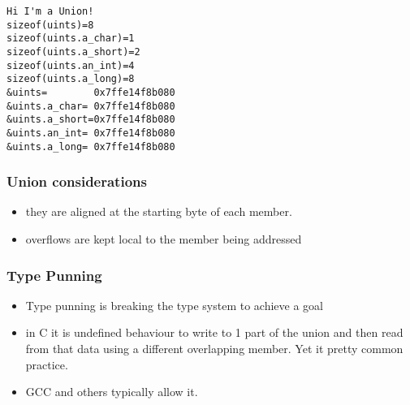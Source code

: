 \documentclass[11pt]{article}
\begin{document}
\begin{verbatim}
Hi I'm a Union!
sizeof(uints)=8
sizeof(uints.a_char)=1
sizeof(uints.a_short)=2
sizeof(uints.an_int)=4
sizeof(uints.a_long)=8
&uints=        0x7ffe14f8b080
&uints.a_char= 0x7ffe14f8b080
&uints.a_short=0x7ffe14f8b080
&uints.an_int= 0x7ffe14f8b080
&uints.a_long= 0x7ffe14f8b080
\end{verbatim}


\subsubsection{Union considerations}
\label{sec:org94686e8}

\begin{itemize}
\item they are aligned at the starting byte of each member.
\item overflows are kept local to the member being addressed
\end{itemize}

\subsubsection{Type Punning}
\label{sec:orgaff9497}
\begin{itemize}
\item Type punning is breaking the type system to achieve a goal
\item in C it is undefined behaviour to write to 1 part of the union
and then read from that data using a different overlapping
member. Yet it pretty common practice.
\item GCC and others typically allow it.
\end{itemize}
\end{document}
